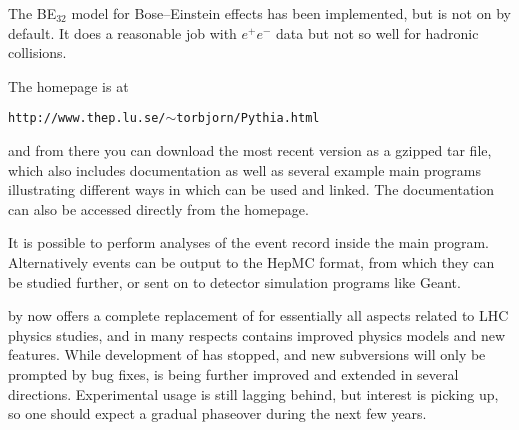 The BE$_{32}$ model for Bose--Einstein effects \cite{Lonnblad:1997kk} 
has been implemented, but is not on by default. It does a reasonable
job with $e^+e^-$ data but not so well for hadronic collisions.   


The \pythiaeight homepage is at
\begin{center} 
\texttt{http://www.thep.lu.se/}$\sim$\texttt{torbjorn/Pythia.html}
\end{center}
and from there you can download the most recent version as a gzipped
tar file, which also includes documentation as well as several example
main programs illustrating different ways in which \pythiaeight can be
used and linked. The documentation can also be accessed directly from the
\pythiaeight homepage. 

It is possible to perform analyses of the event record inside the 
main program. Alternatively events can be output to the HepMC
format, from which they can be studied further, or sent on to
detector simulation programs like Geant.

\mcsubsection{\gensectionoutlook}

\pythiaeight by now offers a complete replacement of \pythiasix
for essentially all aspects related to LHC physics studies, and in 
many respects contains improved physics models and new features. 
While development of \pythiasix has stopped, and new subversions
will only be prompted by bug fixes, \pythiaeight is being further
improved and extended in several directions. Experimental usage is 
still lagging behind, but interest is picking up, so one should 
expect a gradual phaseover during the next few years. 

